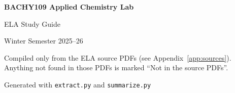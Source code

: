 \documentclass[a4paper,11pt]{article}
\begin{document}
\begin{titlepage}
  \centering
  \vspace*{4cm}
  {\Huge\bfseries BACHY109 Applied Chemistry Lab\par}
  \vspace{0.8cm}
  {\LARGE ELA Study Guide\par}
  \vspace{0.6cm}
  {\Large Winter Semester 2025--26\par}
  \vspace{2cm}
  {\normalsize Compiled only from the ELA source PDFs (see Appendix~\ref{app:sources}).\\
   Anything not found in those PDFs is marked ``Not in the source PDFs''.\par}
  \vfill
  {\small Generated with \texttt{extract.py} and \texttt{summarize.py}\par}
\end{titlepage}

\tableofcontents
\clearpage



\clearpage
\appendix
{}
\end{document}
